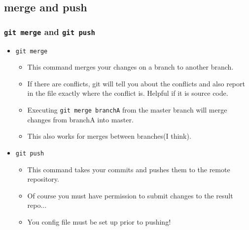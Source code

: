 \documentclass{beamer}
\begin{document}
\subsection{merge and push}
\begin{frame}
    \frametitle{\texttt{git merge} and \texttt{git push}}
    \begin{itemize}
        \item{\texttt{git merge}}
        \begin{itemize}
            \item{This command merges your changes on a branch to another branch.}
            \item{If there are conflicts, git will tell you about the conflicts and also report in the file exactly where the conflict is. Helpful if it is source code.}
            \item{Executing \texttt{git merge branchA} from the master branch will merge changes from branchA into master.}
            \item{This also works for merges between branches(I think).}
        \end{itemize}

    \item{\texttt{git push}}
        \begin{itemize}
            \item{This command takes your commits and pushes them to the remote repository.}
            \item{Of course you must have permission to submit changes to the result repo...}
            \item{You config file must be set up prior to pushing!}
        \end{itemize}

    \end{itemize}
\end{frame}
\end{document}
